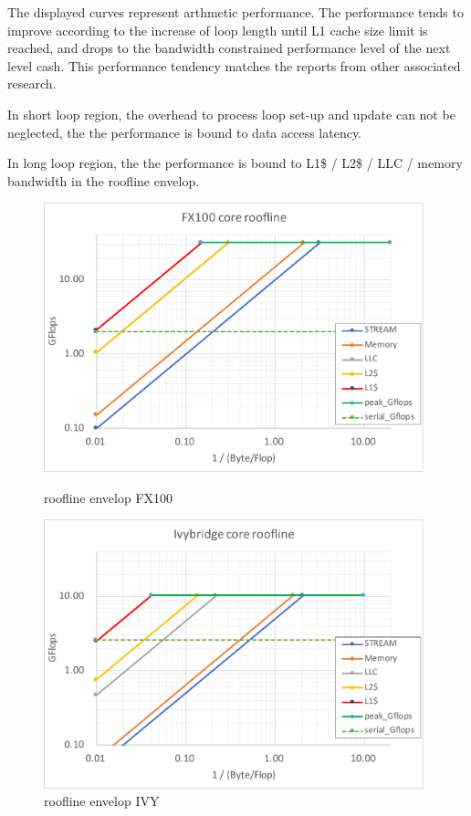 \documentclass[conference]{IEEEtran}
\begin{document}
The displayed curves represent arthmetic performance.
The performance tends to improve according to the increase of
loop length until L1 cache size limit is reached, and drops to
the bandwidth constrained performance level of the next level cash.
This performance tendency matches the reports from other associated research.

In short loop region,
the overhead to process loop set-up and update can not be neglected,
the the performance is bound to data access latency.

In long loop region,
the the performance is bound to
L1\$ / L2\$ / LLC / memory bandwidth in the roofline \cite{Williams:2009}
envelop.

\begin{figure}[tb]
\begin{minipage}{0.48\hsize}
\includegraphics[width=0.98\textwidth]{figs/roofline-fx100.pdf}
\caption{roofline envelop FX100}
\label{fig:roofline-fx100}
\end{minipage}
\begin{minipage}{0.48\hsize}
\includegraphics[width=0.98\textwidth]{figs/roofline-ivy.pdf}
\caption{roofline envelop IVY}
\label{fig:roofline-ivy}
\end{minipage}
\end{figure}
\end{document}
